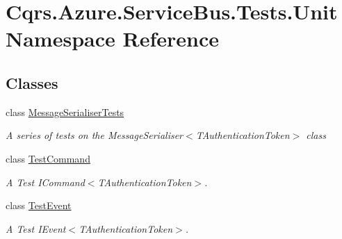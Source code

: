 \hypertarget{namespaceCqrs_1_1Azure_1_1ServiceBus_1_1Tests_1_1Unit}{}\section{Cqrs.\+Azure.\+Service\+Bus.\+Tests.\+Unit Namespace Reference}
\label{namespaceCqrs_1_1Azure_1_1ServiceBus_1_1Tests_1_1Unit}
\subsection*{Classes}
\begin{DoxyCompactItemize}
\item 
class \hyperlink{classCqrs_1_1Azure_1_1ServiceBus_1_1Tests_1_1Unit_1_1MessageSerialiserTests}{Message\+Serialiser\+Tests}
\begin{DoxyCompactList}\small\item\em A series of tests on the Message\+Serialiser$<$\+T\+Authentication\+Token$>$ class \end{DoxyCompactList}\item 
class \hyperlink{classCqrs_1_1Azure_1_1ServiceBus_1_1Tests_1_1Unit_1_1TestCommand}{Test\+Command}
\begin{DoxyCompactList}\small\item\em A Test I\+Command$<$\+T\+Authentication\+Token$>$. \end{DoxyCompactList}\item 
class \hyperlink{classCqrs_1_1Azure_1_1ServiceBus_1_1Tests_1_1Unit_1_1TestEvent}{Test\+Event}
\begin{DoxyCompactList}\small\item\em A Test I\+Event$<$\+T\+Authentication\+Token$>$. \end{DoxyCompactList}\end{DoxyCompactItemize}
